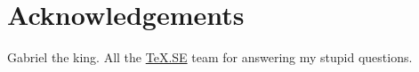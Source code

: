 \chapter{Acknowledgements}
Gabriel the king. All the \href{https://tex.stackexchange.com/}{\TeX.SE} team for answering my stupid questions.
